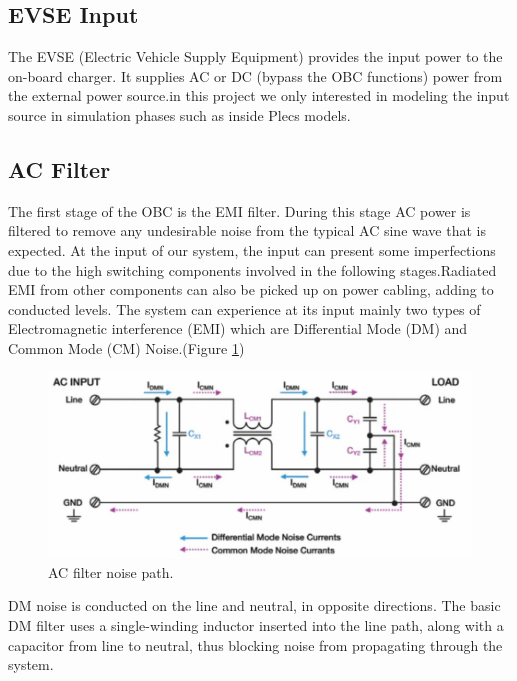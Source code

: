 \documentclass{article}
\begin{document}
\subsection{EVSE Input}
The EVSE (Electric Vehicle Supply Equipment) provides the input power to
the on-board charger. It supplies AC or DC (bypass the OBC functions) power from the external power source.in this project we only interested in modeling the input source in simulation phases such as inside Plecs models.
\subsection{AC Filter}
The first stage of the OBC is the EMI filter. During this stage AC power is filtered to remove any undesirable noise from the typical AC sine wave that is expected. 
At the input of our system, the input can present some imperfections due to the high switching components involved in the following stages.Radiated EMI from other components can also be picked up on power cabling, adding to conducted levels. The system can experience at its input mainly two types of Electromagnetic interference (EMI) which are Differential Mode (DM) and Common Mode (CM) Noise.(Figure \ref{fig:ac_filter})
\begin{figure}[htbp]
    \centering
    \includegraphics[width=\textwidth]{ac_filter.jpg}
    \caption{AC filter noise path.}
    \label{fig:ac_filter}
\end{figure}

DM noise is conducted on the line and neutral, in opposite directions. The basic DM filter uses a single-winding inductor inserted into the line path, along with a capacitor from line to neutral, thus blocking noise from propagating through the system.
\end{document}
